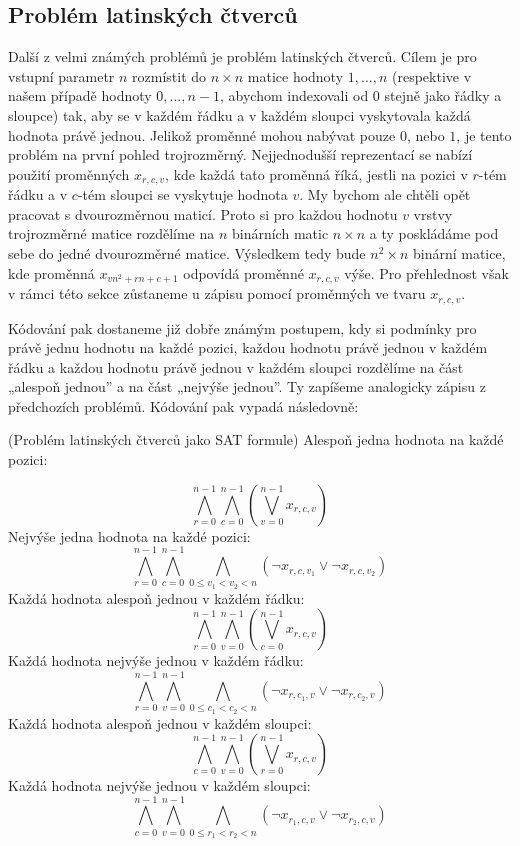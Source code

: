 \subsection{Problém latinských čtverců}
Další z velmi známých problémů je problém latinských čtverců. Cílem je pro vstupní parametr $n$ rozmístit do $n\times n$ matice hodnoty $1,...,n$ (respektive v našem případě hodnoty $0,...,n-1$, abychom indexovali od 0 stejně jako řádky a sloupce) tak, aby se v každém řádku a v každém sloupci vyskytovala každá hodnota právě jednou. Jelikož proměnné mohou nabývat pouze $0$, nebo $1$, je tento problém na první pohled trojrozměrný. Nejjednodušší reprezentací se nabízí použití proměnných $x_{r,c,v}$, kde každá tato proměnná říká, jestli na pozici v $r$-tém řádku a v $c$-tém sloupci se vyskytuje hodnota $v$. My bychom ale chtěli opět pracovat s dvourozměrnou maticí. Proto si pro každou hodnotu $v$ vrstvy trojrozměrné matice rozdělíme na $n$ binárních matic $n\times n$ a ty poskládáme pod sebe do jedné dvourozměrné matice. Výsledkem tedy bude $n^2\times n$ binární matice, kde proměnná $x_{vn^2+rn+c+1}$ odpovídá proměnné $x_{r,c,v}$ výše. Pro přehlednost však v rámci této sekce zůstaneme u zápisu pomocí proměnných ve tvaru $x_{r,c,v}$.

Kódování pak dostaneme již dobře známým postupem, kdy si podmínky pro právě jednu hodnotu na každé pozici, každou hodnotu právě jednou v každém řádku a každou hodnotu právě jednou v každém sloupci rozdělíme na část „alespoň jednou” a na část „nejvýše jednou”. Ty zapíšeme analogicky zápisu z předchozích problémů. Kódování pak vypadá následovně:
\begin{pozn}{(Problém latinských čtverců jako SAT formule)}
Alespoň jedna hodnota na každé pozici:

\[
\bigwedge_{r=0}^{n-1} \bigwedge_{c=0}^{n-1}
\left( \bigvee_{v=0}^{n-1} x_{r,c,v} \right)
\]
Nejvýše jedna hodnota na každé pozici:
\[
\bigwedge_{r=0}^{n-1} \bigwedge_{c=0}^{n-1}
\bigwedge_{0 \le v_1 < v_2 < n}
\left( \neg x_{r,c,v_1} \vee \neg x_{r,c,v_2} \right)
\]
Každá hodnota alespoň jednou v každém řádku:
\[
\bigwedge_{r=0}^{n-1} \bigwedge_{v=0}^{n-1}
\left( \bigvee_{c=0}^{n-1} x_{r,c,v} \right)
\]
Každá hodnota nejvýše jednou v každém řádku:
\[
\bigwedge_{r=0}^{n-1} \bigwedge_{v=0}^{n-1}
\bigwedge_{0 \le c_1 < c_2 < n}
\left( \neg x_{r,c_1,v} \vee \neg x_{r,c_2,v} \right)
\]
Každá hodnota alespoň jednou v každém sloupci:
\[
\bigwedge_{c=0}^{n-1} \bigwedge_{v=0}^{n-1}
\left( \bigvee_{r=0}^{n-1} x_{r,c,v} \right)
\]
Každá hodnota nejvýše jednou v každém sloupci:
\[
\bigwedge_{c=0}^{n-1} \bigwedge_{v=0}^{n-1}
\bigwedge_{0 \le r_1 < r_2 < n}
\left( \neg x_{r_1,c,v} \vee \neg x_{r_2,c,v} \right)
\]
\end{pozn}

